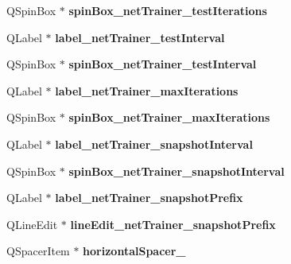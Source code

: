 \begin{DoxyCompactItemize}
\mbox{\label{class_ui___main_window_a546a1fa84b890f39a22fa807c6e34c48}} 
Q\+Spin\+Box $\ast$ {\bfseries spin\+Box\+\_\+net\+Trainer\+\_\+test\+Iterations}
\item 
\mbox{\label{class_ui___main_window_a8765994b70147f0d0a8ffdea833f6fb3}} 
Q\+Label $\ast$ {\bfseries label\+\_\+net\+Trainer\+\_\+test\+Interval}
\item 
\mbox{\label{class_ui___main_window_a8d716856d36a32aa917bf5bf565abfce}} 
Q\+Spin\+Box $\ast$ {\bfseries spin\+Box\+\_\+net\+Trainer\+\_\+test\+Interval}
\item 
\mbox{\label{class_ui___main_window_a548b127560633b52dfcdeca231f5228f}} 
Q\+Label $\ast$ {\bfseries label\+\_\+net\+Trainer\+\_\+max\+Iterations}
\item 
\mbox{\label{class_ui___main_window_ae332eee54e6032a65cda481f00948848}} 
Q\+Spin\+Box $\ast$ {\bfseries spin\+Box\+\_\+net\+Trainer\+\_\+max\+Iterations}
\item 
\mbox{\label{class_ui___main_window_ab5a00a90b58a4743491ae2791061ea3c}} 
Q\+Label $\ast$ {\bfseries label\+\_\+net\+Trainer\+\_\+snapshot\+Interval}
\item 
\mbox{\label{class_ui___main_window_ab34b91ea3a110cdd73c9541388a01a8d}} 
Q\+Spin\+Box $\ast$ {\bfseries spin\+Box\+\_\+net\+Trainer\+\_\+snapshot\+Interval}
\item 
\mbox{\label{class_ui___main_window_af33ebc498ad43da475bdc43422989e82}} 
Q\+Label $\ast$ {\bfseries label\+\_\+net\+Trainer\+\_\+snapshot\+Prefix}
\item 
\mbox{\label{class_ui___main_window_a8c763e56fa828f4351616f009e6c279a}} 
Q\+Line\+Edit $\ast$ {\bfseries line\+Edit\+\_\+net\+Trainer\+\_\+snapshot\+Prefix}
\item 
\mbox{\label{class_ui___main_window_a4fc05b11984637298795a354792c4023}} 
Q\+Spacer\+Item $\ast$ {\bfseries horizontal\+Spacer\+\_}

\end{DoxyCompactItemize}
